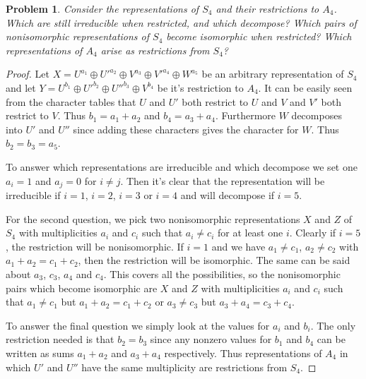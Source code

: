 \documentclass{article}
\newtheorem{problem}{Problem}
\begin{document}
\begin{problem}
Consider the representations of $S_4$ and their restrictions to $A_4$. Which are still irreducible when restricted, and which decompose? Which pairs of nonisomorphic representations of $S_4$ become isomorphic when restricted? Which representations of $A_4$ arise as restrictions from $S_4$?
\end{problem}
\begin{proof}
Let $X = U^{a_1} \oplus U'^{a_2} \oplus V^{a_3} \oplus V'^{a_4} \oplus W^{a_5}$ be an arbitrary representation of $S_4$ and let $Y = U^{b_1} \oplus U'^{b_2} \oplus U''^{b_3} \oplus V^{b_4}$ be it's restriction to $A_4$. It can be easily seen from the character tables that $U$ and $U'$ both restrict to $U$ and $V$ and $V'$ both restrict to $V$. Thus $b_1 = a_1 + a_2$ and $b_4 = a_3 + a_4$. Furthermore $W$ decomposes into $U'$ and $U''$ since adding these characters gives the character for $W$. Thus $b_2 = b_3 = a_5$.

To answer which representations are irreducible and which decompose we set one $a_i = 1$ and $a_j = 0$ for $i \neq j$. Then it's clear that the representation will be irreducible if $i = 1$, $i = 2$, $i = 3$ or $i = 4$ and will decompose if $i = 5$.

For the second question, we pick two nonisomorphic representations $X$ and $Z$ of $S_4$ with multiplicities $a_i$ and $c_i$ such that $a_i \neq c_i$ for at least one $i$. Clearly if $i = 5$, the restriction will be nonisomorphic. If $i = 1$ and we have $a_1 \neq c_1$, $a_2 \neq c_2$ with $a_1 + a_2 = c_1 + c_2$, then the restriction will be isomorphic. The same can be said about $a_3$, $c_3$, $a_4$ and $c_4$. This covers all the possibilities, so the nonisomorphic pairs which become isomorphic are $X$ and $Z$ with multiplicities $a_i$ and $c_i$ such that $a_1 \neq c_1$ but $a_1 + a_2 = c_1 + c_2$ or $a_3 \neq c_3$ but $a_3 + a_4 = c_3 + c_4$.

To answer the final question we simply look at the values for $a_i$ and $b_i$. The only restriction needed is that $b_2 = b_3$ since any nonzero values for $b_1$ and $b_4$ can be written as sums $a_1 + a_2$ and $a_3 + a_4$ respectively. Thus representations of $A_4$ in which $U'$ and $U''$ have the same multiplicity are restrictions from $S_4$.
\end{proof}
\end{document}
